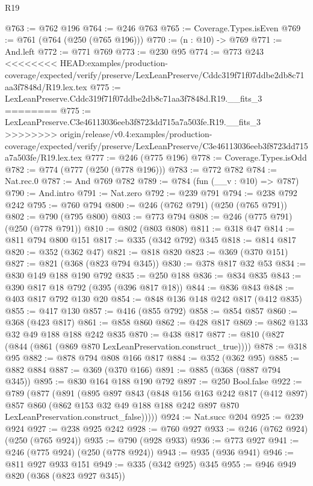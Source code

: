 \begin{lexlean}{R19}
\begin{coremodule}
{{{{{{{{{{{{{{@763 := @762 @196
@764 := @246 @763
@765 := Coverage.Types.isEven
@769 := @761 (@764 (@250 (@765 @196)))
@770 := (n : @10) -> @769
@771 := And.left
@772 := @771 @769
@773 := @230 @95
@774 := @773 @243
<<<<<<<< HEAD:examples/production-coverage/expected/verify/preserve/LexLeanPreserve/Cddc319f71f07ddbe2db8c71aa3f7848d/R19.lex.tex
@775 := LexLeanPreserve.Cddc319f71f07ddbe2db8c71aa3f7848d.R19.__fits_3
========
@775 := LexLeanPreserve.C3e46113036eeb3f8723dd715a7a503fe.R19.__fits_3
>>>>>>>> origin/release/v0.4:examples/production-coverage/expected/verify/preserve/LexLeanPreserve/C3e46113036eeb3f8723dd715a7a503fe/R19.lex.tex
@777 := @246 (@775 @196)
@778 := Coverage.Types.isOdd
@782 := @774 (@777 (@250 (@778 @196)))
@783 := @772 @782
@784 := Nat.rec.{0}
@787 := And @769 @782
@789 := @784 (fun (__v : @10) => @787)
@790 := And.intro
@791 := Nat.zero
@792 := @239 @791
@794 := @238 @792 @242
@795 := @760 @794
@800 := @246 (@762 @791) (@250 (@765 @791))
@802 := @790 (@795 @800)
@803 := @773 @794
@808 := @246 (@775 @791) (@250 (@778 @791))
@810 := @802 (@803 @808)
@811 := @318 @47
@814 := @811 @794 @800 @151
@817 := @335 (@342 @792) @345
@818 := @814 @817
@820 := @352 (@362 @47)
@821 := @818 @820
@823 := @369 (@370 @151)
@827 := @821 (@368 (@823 @794 @345))
@830 := @378 @817 @32 @53
@834 := @830 @149 @188 @190 @792
@835 := @250 @188
@836 := @834 @835
@843 := @390 @817 @18 @792 (@395 (@396 @817 @18))
@844 := @836 @843
@848 := @403 @817 @792 @130 @20
@854 := @848 @136 @148 @242 @817 (@412 @835)
@855 := @417 @130
@857 := @416 (@855 @792)
@858 := @854 @857
@860 := @368 (@423 @817)
@861 := @858 @860
@862 := @428 @817
@869 := @862 @133 @32 @49 @188 @188 @242 @835
@870 := @438 @817
@877 := @810 (@827 (@844 (@861 (@869 @870 LexLeanPreservation.construct_true))))
@878 := @318 @95
@882 := @878 @794 @808 @166 @817
@884 := @352 (@362 @95)
@885 := @882 @884
@887 := @369 (@370 @166)
@891 := @885 (@368 (@887 @794 @345))
@895 := @830 @164 @188 @190 @792
@897 := @250 Bool.false
@922 := @789
    (@877
      (@891
        (@895
          @897
          @843
          (@848
            @156
            @163
            @242
            @817
            (@412 @897)
            @857
            @860
            (@862 @153 @32 @49 @188 @188 @242 @897 @870 LexLeanPreservation.construct_false)))))
@924 := Nat.succ @204
@925 := @239 @924
@927 := @238 @925 @242
@928 := @760 @927
@933 := @246 (@762 @924) (@250 (@765 @924))
@935 := @790 (@928 @933)
@936 := @773 @927
@941 := @246 (@775 @924) (@250 (@778 @924))
@943 := @935 (@936 @941)
@946 := @811 @927 @933 @151
@949 := @335 (@342 @925) @345
@955 := @946 @949 @820 (@368 (@823 @927 @345))
}}}}}}}}}}}}}}
\end{coremodule}
\end{lexlean}
